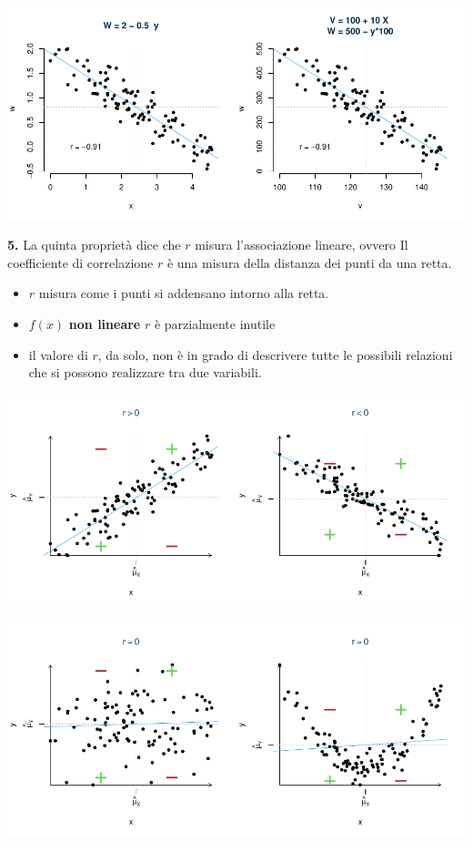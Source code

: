 \documentclass[
  11pt,
]{book}
\providecommand{\tightlist}{%
  \setlength{\itemsep}{0pt}\setlength{\parskip}{0pt}}
\theoremstyle{mytheoremstyle}
\theoremstyle{mydefstyle}
\begin{document}
\begin{center}\includegraphics{Appunti_di_Statistica_2025_files/figure-latex/17-regressione-I-50-1} \end{center}

\textbf{5.} La quinta proprietà dice che \(r\) misura l'associazione lineare, ovvero
Il coefficiente di correlazione \(r\) è una misura della distanza dei punti da una retta.

\begin{itemize}
\tightlist
\item
  \(r\) misura come i punti si addensano intorno alla retta.
\item
  \(f(x)\) \textbf{non lineare} \(r\) è parzialmente inutile
\item
  il valore di \(r\), da solo, non è in grado di descrivere tutte le possibili relazioni
  che si possono realizzare tra due variabili.
\end{itemize}

\begin{center}\includegraphics{Appunti_di_Statistica_2025_files/figure-latex/17-regressione-I-51-1} \end{center}

\begin{center}\includegraphics{Appunti_di_Statistica_2025_files/figure-latex/17-regressione-I-52-1} \end{center}
\end{document}

